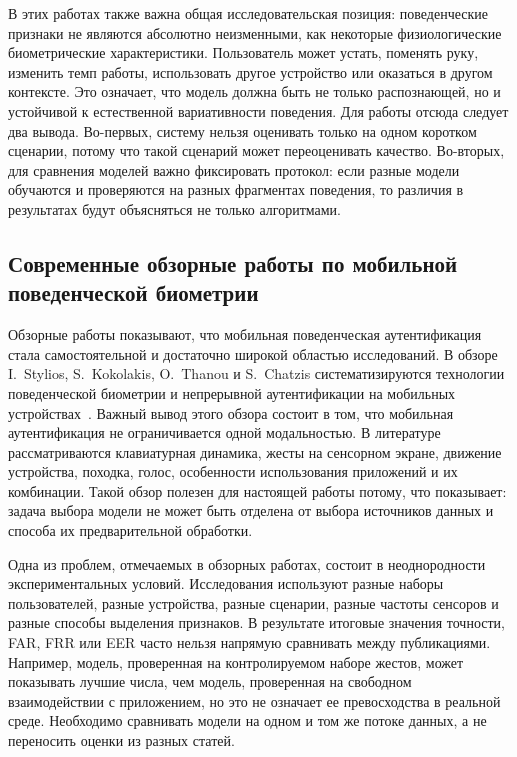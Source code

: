 \documentclass[oneside,senior,etd]{BYUPhys}
\begin{document}
В этих работах также важна общая исследовательская позиция: поведенческие признаки не являются абсолютно неизменными, как некоторые физиологические биометрические характеристики. Пользователь может устать, поменять руку, изменить темп работы, использовать другое устройство или оказаться в другом контексте. Это означает, что модель должна быть не только распознающей, но и устойчивой к естественной вариативности поведения. Для работы отсюда следует два вывода. Во-первых, систему нельзя оценивать только на одном коротком сценарии, потому что такой сценарий может переоценивать качество. Во-вторых, для сравнения моделей важно фиксировать протокол: если разные модели обучаются и проверяются на разных фрагментах поведения, то различия в результатах будут объясняться не только алгоритмами.

\subsection{Современные обзорные работы по мобильной поведенческой биометрии}

Обзорные работы показывают, что мобильная поведенческая аутентификация стала самостоятельной и достаточно широкой областью исследований. В обзоре I.~Stylios, S.~Kokolakis, O.~Thanou и S.~Chatzis систематизируются технологии поведенческой биометрии и непрерывной аутентификации на мобильных устройствах~\cite{stylios2021survey}. Важный вывод этого обзора состоит в том, что мобильная аутентификация не ограничивается одной модальностью. В литературе рассматриваются клавиатурная динамика, жесты на сенсорном экране, движение устройства, походка, голос, особенности использования приложений и их комбинации. Такой обзор полезен для настоящей работы потому, что показывает: задача выбора модели не может быть отделена от выбора источников данных и способа их предварительной обработки.

Одна из проблем, отмечаемых в обзорных работах, состоит в неоднородности экспериментальных условий. Исследования используют разные наборы пользователей, разные устройства, разные сценарии, разные частоты сенсоров и разные способы выделения признаков. В результате итоговые значения точности, FAR, FRR или EER часто нельзя напрямую сравнивать между публикациями. Например, модель, проверенная на контролируемом наборе жестов, может показывать лучшие числа, чем модель, проверенная на свободном взаимодействии с приложением, но это не означает ее превосходства в реальной среде. Необходимо сравнивать модели на одном и том же потоке данных, а не переносить оценки из разных статей.
\end{document}

